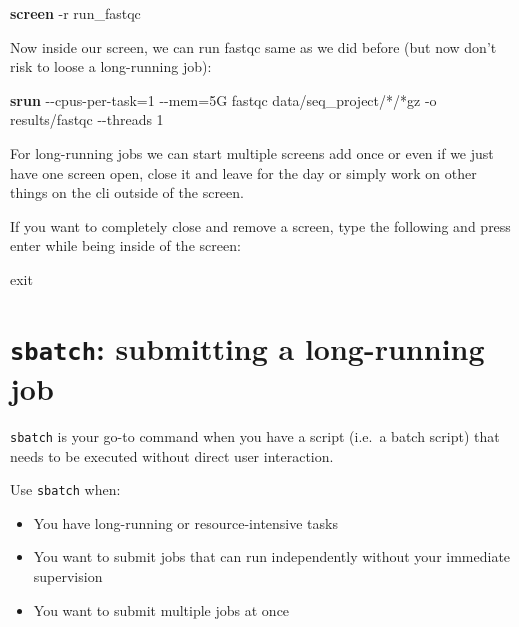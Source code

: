 \documentclass[
  letterpaper,
  DIV=11,
  numbers=noendperiod]{scrreprt}
\newenvironment{Shaded}{}{}
\newcommand{\AttributeTok}[1]{\textcolor[rgb]{0.84,0.23,0.29}{#1}}
\newcommand{\BuiltInTok}[1]{\textcolor[rgb]{0.84,0.23,0.29}{#1}}
\newcommand{\ExtensionTok}[1]{\textcolor[rgb]{0.84,0.23,0.29}{\textbf{#1}}}
\newcommand{\NormalTok}[1]{\textcolor[rgb]{0.14,0.16,0.18}{#1}}
\newcommand{\OperatorTok}[1]{\textcolor[rgb]{0.14,0.16,0.18}{#1}}
\newcommand{\PreprocessorTok}[1]{\textcolor[rgb]{0.84,0.23,0.29}{#1}}
\providecommand{\tightlist}{%
  \setlength{\itemsep}{0pt}\setlength{\parskip}{0pt}}\usepackage{longtable,booktabs,array}
\begin{document}
\begin{Shaded}
\begin{Highlighting}[]
\ExtensionTok{screen} \AttributeTok{{-}r}\NormalTok{ run\_fastqc}
\end{Highlighting}
\end{Shaded}

Now inside our screen, we can run fastqc same as we did before (but now
don't risk to loose a long-running job):

\begin{Shaded}
\begin{Highlighting}[]
\ExtensionTok{srun} \AttributeTok{{-}{-}cpus{-}per{-}task}\OperatorTok{=}\NormalTok{1 }\AttributeTok{{-}{-}mem}\OperatorTok{=}\NormalTok{5G fastqc data/seq\_project/}\PreprocessorTok{*}\NormalTok{/}\PreprocessorTok{*}\NormalTok{gz }\AttributeTok{{-}o}\NormalTok{ results/fastqc  }\AttributeTok{{-}{-}threads}\NormalTok{ 1 }
\end{Highlighting}
\end{Shaded}

For long-running jobs we can start multiple screens add once or even if
we just have one screen open, close it and leave for the day or simply
work on other things on the cli outside of the screen.

If you want to completely close and remove a screen, type the following
and press enter while being inside of the screen:

\begin{Shaded}
\begin{Highlighting}[]
\BuiltInTok{exit}
\end{Highlighting}
\end{Shaded}

\section{\texorpdfstring{\texttt{sbatch}: submitting a long-running
job}{sbatch: submitting a long-running job}}\label{sbatch-submitting-a-long-running-job}

\texttt{sbatch} is your go-to command when you have a script (i.e.~a
batch script) that needs to be executed without direct user interaction.

Use \texttt{sbatch} when:

\begin{itemize}
\tightlist
\item
  You have long-running or resource-intensive tasks
\item
  You want to submit jobs that can run independently without your
  immediate supervision
\item
  You want to submit multiple jobs at once
\end{itemize}
\end{document}
